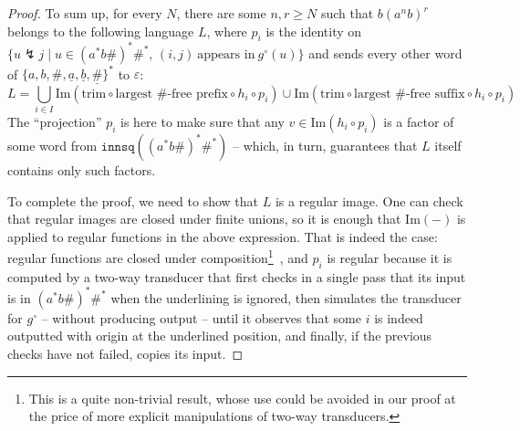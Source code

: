 \documentclass{fundam}
\newcommand{\Image}{\mathrm{Im}}
\theoremstyle{claimstyle}
\newcommand\withul{\lightning}
\newcommand\innsq{\mathtt{innsq}}
\begin{document}
\begin{proof}
To sum up, for every $N$, there are some $n,r \geq N$ such that
$b(a^n b)^r$ belongs to the following language $L$,
where $p_i$ is the identity on $\{u\withul j \mid u\in (a^*b\#)^*\#^*,\,
(i,j)\ \text{appears in}\ g^\circ(u)\}$ and sends every other word of
$\{a,b,\#,\underline{a},\underline{b},\underline\#\}^{*}$ to
$\varepsilon$:
\[ L = \bigcup_{i\in I} \Image(\text{trim} \circ \text{largest \#-free
    prefix} \circ h_i \circ p_i) \cup \Image(\text{trim} \circ \text{largest
    \#-free suffix} \circ h_i \circ p_i) \]
The \enquote{projection} $p_i$ is here to make sure that any $v \in \Image(h_i
\circ p_i)$ is a factor of some word from $\innsq((a^*b\#)^*\#^*)$ --
which, in turn, guarantees that $L$ itself contains only such factors.

To complete the proof, we need to show that $L$ is a regular image. One can
check that regular images are closed under finite unions, so it is enough that
$\Image(-)$ is applied to regular functions in the above expression. That is
indeed the case: regular functions are closed under
composition\footnote{This is a quite non-trivial result, whose use could be avoided
in our proof at the price of more explicit manipulations of two-way
transducers.}~\cite{ChytilJ77}, and $p_i$ is regular because it is computed by a
two-way transducer that first checks in a single pass that its input is in
$(a^*b\#)^*\#^*$ when the underlining is ignored, then simulates the transducer
for $g^\circ$ -- without producing output -- until it observes that some $i$ is
indeed outputted with origin at the underlined position, and finally, if the
previous checks have not failed, copies its input.
\end{proof}
\end{document}
